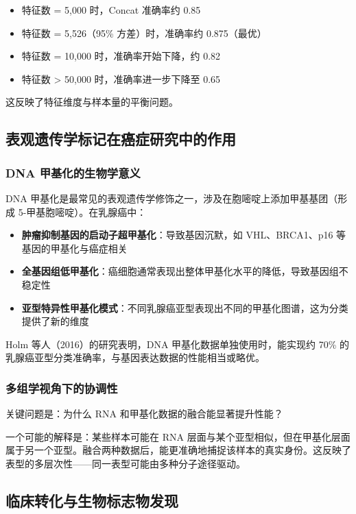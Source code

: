 \begin{itemize}
    \item 特征数 = 5,000 时，Concat 准确率约 0.85
    \item 特征数 = 5,526（95\% 方差）时，准确率约 0.875（最优）
    \item 特征数 = 10,000 时，准确率开始下降，约 0.82
    \item 特征数 > 50,000 时，准确率进一步下降至 0.65
\end{itemize}

这反映了特征维度与样本量的平衡问题。

\subsection{表观遗传学标记在癌症研究中的作用}

\subsubsection{DNA 甲基化的生物学意义}

DNA 甲基化是最常见的表观遗传学修饰之一，涉及在胞嘧啶上添加甲基基团（形成 5-甲基胞嘧啶）。在乳腺癌中：

\begin{itemize}
    \item \textbf{肿瘤抑制基因的启动子超甲基化}：导致基因沉默，如 VHL、BRCA1、p16 等基因的甲基化与癌症相关
    \item \textbf{全基因组低甲基化}：癌细胞通常表现出整体甲基化水平的降低，导致基因组不稳定性
    \item \textbf{亚型特异性甲基化模式}：不同乳腺癌亚型表现出不同的甲基化图谱，这为分类提供了新的维度
\end{itemize}

Holm 等人（2016）的研究表明，DNA 甲基化数据单独使用时，能实现约 70\% 的乳腺癌亚型分类准确率，与基因表达数据的性能相当或略优。

\subsubsection{多组学视角下的协调性}

关键问题是：为什么 RNA 和甲基化数据的融合能显著提升性能？

一个可能的解释是：某些样本可能在 RNA 层面与某个亚型相似，但在甲基化层面属于另一个亚型。融合两种数据后，能更准确地捕捉该样本的真实身份。这反映了表型的多层次性——同一表型可能由多种分子途径驱动。

\subsection{临床转化与生物标志物发现}


